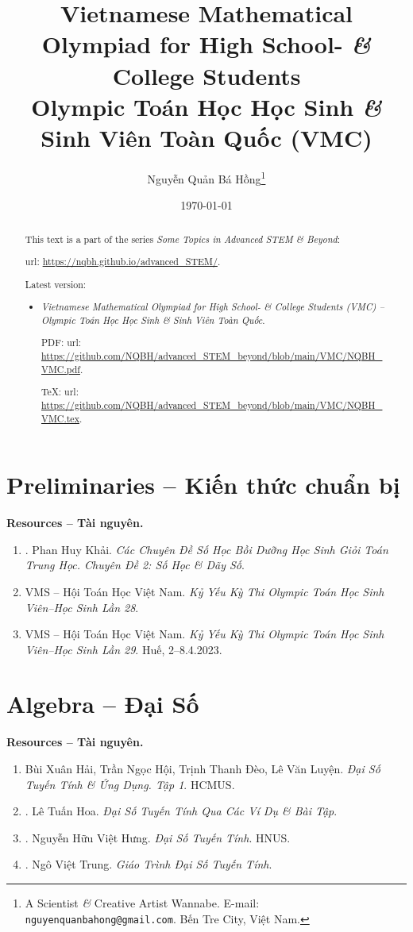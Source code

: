 \documentclass{article}
\title{Vietnamese Mathematical Olympiad for High School- {\it\&} College Students\\Olympic Toán Học Học Sinh {\it\&} Sinh Viên Toàn Quốc (VMC)}
\author{Nguyễn Quản Bá Hồng\footnote{A Scientist {\it\&} Creative Artist Wannabe. E-mail: {\tt nguyenquanbahong@gmail.com}. Bến Tre City, Việt Nam.}}
\date{\today}
\begin{document}
\maketitle
\begin{abstract}
	This text is a part of the series {\it Some Topics in Advanced STEM \& Beyond}:
	
	{\sc url}: \url{https://nqbh.github.io/advanced_STEM/}.
	
	Latest version:
	\begin{itemize}
		\item {\it Vietnamese Mathematical Olympiad for High School- \& College Students (VMC) -- Olympic Toán Học Học Sinh \& Sinh Viên Toàn Quốc}.
		
		PDF: {\sc url}: \url{https://github.com/NQBH/advanced_STEM_beyond/blob/main/VMC/NQBH_VMC.pdf}.
		
		\TeX: {\sc url}: \url{https://github.com/NQBH/advanced_STEM_beyond/blob/main/VMC/NQBH_VMC.tex}.
	\end{itemize}
\end{abstract}
\tableofcontents


\section{Preliminaries -- Kiến thức chuẩn bị}

\textbf{\textsf{Resources -- Tài nguyên.}}
\begin{enumerate}
	\item \cite{Khai_so_hoc_day_so}. {\sc Phan Huy Khải}. {\it Các Chuyên Đề Số Học Bồi Dưỡng Học Sinh Giỏi Toán Trung Học. Chuyên Đề 2: Số Học \& Dãy Số}.
	\item {\sc VMS -- Hội Toán Học Việt Nam}. {\it Kỷ Yếu Kỳ Thi Olympic Toán Học Sinh Viên--Học Sinh Lần 28}.
	\item {\sc VMS -- Hội Toán Học Việt Nam}. {\it Kỷ Yếu Kỳ Thi Olympic Toán Học Sinh Viên--Học Sinh Lần 29}. Huế, 2--8.4.2023.
\end{enumerate}

\section{Algebra -- Đại Số}
\textbf{\textsf{Resources -- Tài nguyên.}}
\begin{enumerate}
	\item {\sc Bùi Xuân Hải, Trần Ngọc Hội, Trịnh Thanh Đèo, Lê Văn Luyện}. {\it Đại Số Tuyến Tính \& Ứng Dụng. Tập 1}. HCMUS.
	\item \cite{Hoa_linear_algebra}. {\sc Lê Tuấn Hoa}. {\it Đại Số Tuyến Tính Qua Các Ví Dụ \& Bài Tập}.
	\item \cite{Hung_linear_algebra}. {\sc Nguyễn Hữu Việt Hưng}. {\it Đại Số Tuyến Tính}. HNUS.
	\item \cite{Trung_linear_algebra}. {\sc Ngô Việt Trung}. {\it Giáo Trình Đại Số Tuyến Tính}.
\end{enumerate}
\end{document}

